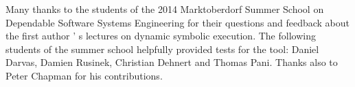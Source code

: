 \documentclass{IOS-Book-Article}
\begin{document}
\begin{mdP}[data-line={899}]%
{}Many thanks to the students of the 2014 Marktoberdorf Summer School
on Dependable Software Systems Engineering
for their questions and feedback about the first author%
{}{'}%
{}s lectures on dynamic
symbolic execution. The following students of the summer school
helpfully provided tests for the%
{}{\mdNbsp}%
{} tool: Daniel Darvas,
Damien Rusinek, Christian Dehnert and Thomas Pani. Thanks also to Peter
Chapman for his contributions.%
\end{mdP}%
\end{document}
